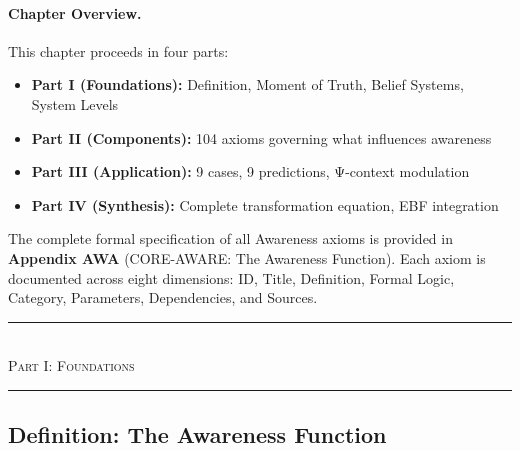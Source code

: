 \paragraph{Chapter Overview.}
This chapter proceeds in four parts:
\begin{itemize}
    \item \textbf{Part I (Foundations):} Definition, Moment of Truth, Belief Systems, System Levels
    \item \textbf{Part II (Components):} 104 axioms governing what influences awareness
    \item \textbf{Part III (Application):} 9 cases, 9 predictions, Ψ-context modulation
    \item \textbf{Part IV (Synthesis):} Complete transformation equation, EBF integration
\end{itemize}

\begin{note}
The complete formal specification of all Awareness axioms is provided in
\textbf{Appendix AWA} (CORE-AWARE: The Awareness Function).
Each axiom is documented across eight dimensions: ID, Title, Definition,
Formal Logic, Category, Parameters, Dependencies, and Sources.
\end{note}



\begin{center}
\rule{0.8\textwidth}{0.4pt}\\[0.5em]
{\large\textsc{Part I: Foundations}}\\[0.3em]
\rule{0.8\textwidth}{0.4pt}
\end{center}

\subsection{Definition: The Awareness Function}
\label{subsec:11-1-definition}



